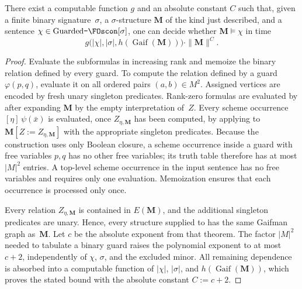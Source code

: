 \documentclass[1p,number,11pt]{elsarticle}
\newcommand{\GFOscon}{\textup{Guarded}\raisebox{0.4pt}{\texttt{-}}\FOscon}
\renewcommand{\phi}{\varphi}
\newcommand{\Gaif}{\operatorname{Gaif}}
\theoremstyle{plain}
\begin{document}
\begin{theorem}\label{thm:MC-guarder-logic}
There exist a computable function $g$ and an absolute constant $C$ such that,
given a finite binary signature~$\sigma$, a $\sigma$-structure $\mathbf M$ of
the kind just described, and a sentence $\chi\in\GFOscon[\sigma]$, one can
decide whether $\mathbf M\models\chi$ in time
\[
 g\bigl(|\chi|,|\sigma|,h(\Gaif(\mathbf M))\bigr)\cdot\|\mathbf M\|^C.
\]
\end{theorem}
\begin{proof}
Evaluate the subformulas in increasing rank and memoize the binary relation
defined by every guard. To compute the relation defined by a guard
$\phi(p,q)$, evaluate it on all ordered pairs $(a,b)\in M^2$. Assigned
vertices are encoded by fresh unary singleton predicates. Rank-zero formulas
are evaluated by  after expanding $\mathbf M$ by the empty
interpretation of~$Z$. Every scheme occurrence
$[\eta]\,\psi(\bar x)$ is evaluated, once $Z_{\eta,\mathbf M}$ has been
computed, by applying  to
$\mathbf M[Z:=Z_{\eta,\mathbf M}]$ with the appropriate singleton
predicates. Because the construction uses only Boolean closure, a scheme
occurrence inside a guard with free variables $p,q$ has no other free
variables; its truth table therefore has at most $|M|^2$ entries. A
top-level scheme occurrence in the input sentence has no free variables and requires only one evaluation. Memoization ensures that each occurrence is
processed only once.

Every relation $Z_{\eta,\mathbf M}$ is contained in $E(\mathbf M)$, and the
additional singleton predicates are unary. Hence, every structure supplied to
 has the same Gaifman graph as~$\mathbf M$. Let $c$ be the
absolute exponent from that theorem. The factor $|M|^2$ needed to tabulate a
binary guard raises the polynomial exponent to at most $c+2$, independently
of $\chi$, $\sigma$, and the excluded minor. All remaining dependence is
absorbed into a computable function of
$|\chi|$, $|\sigma|$, and $h(\Gaif(\mathbf M))$, which proves the stated bound
with the absolute constant $C:=c+2$.
\end{proof}
\end{document}
